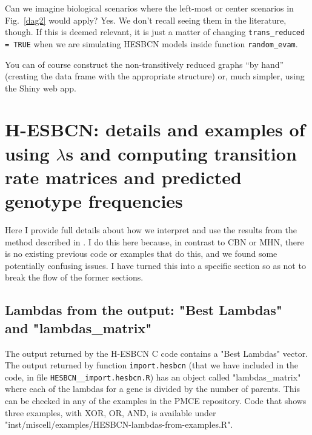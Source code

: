 \documentclass[a4paper,11pt]{article}
\begin{document}




Can we imagine biological scenarios where the left-most or center scenarios in Fig.~\ref{dag2} would apply? Yes. We don't recall seeing them in the literature, though. If this is deemed relevant, it is just a matter of changing  \texttt{trans\_reduced = TRUE} when we are simulating HESBCN models inside function \texttt{random\_evam}.

You can of course construct the non-transitively reduced graphs ``by hand'' (creating the data frame with the appropriate structure) or, much simpler, using the Shiny web app.



\section{H-ESBCN: details and examples of using $\lambda$s and computing transition rate matrices and predicted genotype frequencies}\label{hesbcn}

Here I provide full details about how we interpret and use the results from the method described in \cite{angaroni2021}. I do this here because, in contrast to CBN or MHN, there is no existing previous code or examples that do this, and we found some potentially confusing issues. I have turned this into a specific section so as not to break the flow of the former sections.


\subsection{Lambdas from the output: "Best Lambdas" and "lambdas\_matrix"}

The output returned by the H-ESBCN C code contains a "Best Lambdas" vector. The output returned by function \texttt{import.hesbcn} (that we have included in the code, in file \texttt{HESBCN\_\_import.hesbcn.R}) has an object called "lambdas\_matrix" where each of the lambdas for a gene is divided by the number of parents. This can be checked in any of the examples in the PMCE repository. Code that shows three examples, with XOR, OR, AND, is available under "inst/miscell/examples/HESBCN-lambdas-from-examples.R".
\end{document}
